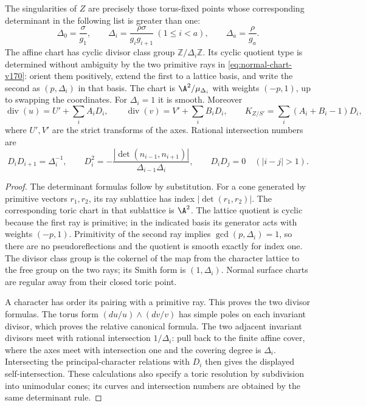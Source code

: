 \begin{proposition}
\label{prop:ramified-singularities-v170}
The singularities of $Z$ are precisely those torus-fixed points whose
corresponding determinant in the following list is greater than one:
\begin{equation}\label{eq:cone-indices-v170}
 \Delta_0=\frac{\sigma}{g_1},\qquad
 \Delta_i=\frac{\rho\sigma}{g_i g_{i+1}}\ (1\leq i<a),\qquad
 \Delta_a=\frac{\rho}{g_a}.
\end{equation}
The affine chart has cyclic divisor class group
$\mathbb Z/\Delta_i\mathbb Z$. Its cyclic quotient type is determined
without ambiguity by the two primitive rays in
\eqref{eq:normal-chart-v170}: orient them positively, extend the
first to a lattice basis, and write the second as $(p,\Delta_i)$
in that basis. The chart is $\A^2/\mu_{\Delta_i}$ with weights
$(-p,1)$, up to swapping the coordinates. For $\Delta_i=1$ it is smooth.
Moreover
\[
 \operatorname{div}(u)=U'+\sum_i A_iD_i,
 \qquad \operatorname{div}(v)=V'+\sum_i B_iD_i,
 \qquad K_{Z/S'}=\sum_i(A_i+B_i-1)D_i,
\]
where $U',V'$ are the strict transforms of the axes. Rational
intersection numbers are
\[
 D_iD_{i+1}=\Delta_i^{-1},\qquad
 D_i^2=-\frac{|\det(n_{i-1},n_{i+1})|}{\Delta_{i-1}\Delta_i},
 \qquad D_iD_j=0\quad(|i-j|>1).
\]
\end{proposition}
\begin{proof}
The determinant formulas follow by substitution. For a cone generated
by primitive vectors $r_1,r_2$, its ray sublattice has index
$|\det(r_1,r_2)|$. The corresponding toric chart in that sublattice
is $\A^2$. The lattice quotient is cyclic because the first ray is
primitive; in the indicated basis its generator acts with weights
$(-p,1)$. Primitivity of the second ray implies
$\gcd(p,\Delta_i)=1$, so there are no pseudoreflections and the
quotient is smooth exactly for index one. The divisor class group
is the cokernel of the map from the character lattice to the free
group on the two rays; its Smith form is $(1,\Delta_i)$.
Normal surface charts are regular away from their closed toric point.

A character has order its pairing with a primitive ray. This proves
the two divisor formulas. The torus form
$(du/u)\wedge(dv/v)$ has simple poles on each invariant divisor,
which proves the relative canonical formula. The two adjacent
invariant divisors meet with rational intersection $1/\Delta_i$:
pull back to the finite affine cover, where the axes meet with
intersection one and the covering degree is $\Delta_i$. Intersecting
the principal-character relations with $D_i$ then gives the displayed
self-intersection. These calculations also specify a toric resolution
by subdivision into unimodular cones; its curves and intersection
numbers are obtained by the same determinant rule.
\end{proof}

